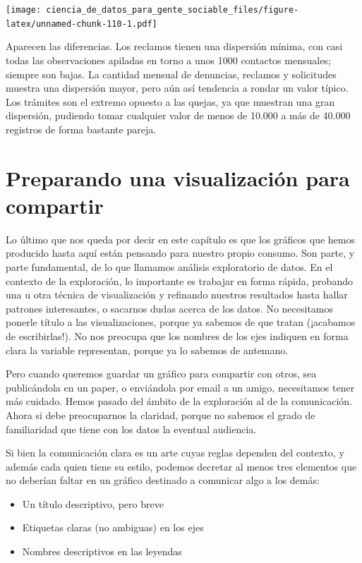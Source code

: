 \documentclass[spanish,]{book}
\providecommand{\tightlist}{%
  \setlength{\itemsep}{0pt}\setlength{\parskip}{0pt}}
\begin{document}
\texttt{[image: ciencia\_de\_datos\_para\_gente\_sociable\_files/figure-latex/unnamed-chunk-110-1.pdf]}

Aparecen las diferencias. Los reclamos tienen una dispersión mínima, con casi todas las observaciones apiladas en torno a unos 1000 contactos mensuales; siempre son bajas. La cantidad mensual de denuncias, reclamos y solicitudes muestra una dispersión mayor, pero aún así tendencia a rondar un valor típico. Los trámites son el extremo opuesto a las quejas, ya que muestran una gran dispersión, pudiendo tomar cualquier valor de menos de 10.000 a más de 40.000 registros de forma bastante pareja.

\hypertarget{preparando-una-visualizaciuxf3n-para-compartir}{%
\section{Preparando una visualización para compartir}\label{preparando-una-visualizaciuxf3n-para-compartir}}

Lo último que nos queda por decir en este capítulo es que los gráficos que hemos producido hasta aquí están pensando para nuestro propio consumo. Son parte, y parte fundamental, de lo que llamamos análisis exploratorio de datos. En el contexto de la exploración, lo importante es trabajar en forma rápida, probando una u otra técnica de visualización y refinando nuestros resultados hasta hallar patrones interesantes, o sacarnos dudas acerca de los datos. No necesitamos ponerle título a las visualizaciones, porque ya sabemos de que tratan (¡acabamos de escribirlas!). No nos preocupa que los nombres de los ejes indiquen en forma clara la variable representan, porque ya lo sabemos de antemano.

Pero cuando queremos guardar un gráfico para compartir con otros, sea publicándola en un paper, o enviándola por email a un amigo, necesitamos tener más cuidado. Hemos pasado del ámbito de la exploración al de la comunicación. Ahora si debe preocuparnos la claridad, porque no sabemos el grado de familiaridad que tiene con los datos la eventual audiencia.

Si bien la comunicación clara es un arte cuyas reglas dependen del contexto, y además cada quien tiene su estilo, podemos decretar al menos tres elementos que no deberían faltar en un gráfico destinado a comunicar algo a los demás:

\begin{itemize}
\tightlist
\item
  Un título descriptivo, pero breve
\item
  Etiquetas claras (no ambiguas) en los ejes
\item
  Nombres descriptivos en las leyendas
\end{itemize}
\end{document}
